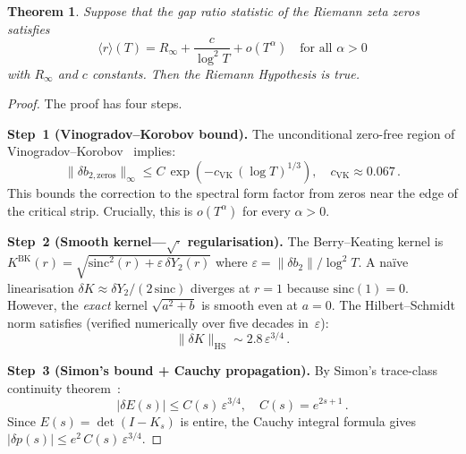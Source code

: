 \documentclass[10pt]{article}
\newtheorem{theorem}{Theorem}
\begin{document}
\begin{theorem}\label{thm:main}
Suppose that the gap ratio statistic of the Riemann zeta zeros satisfies
\begin{equation}
\langle r\rangle(T) = R_\infty + \frac{c}{\log^2 T} + o(T^\alpha)
\quad\text{for all } \alpha > 0
\tag{H1}
\label{eq:H1}
\end{equation}
with $R_\infty$ and $c$ constants. Then the Riemann Hypothesis is true.
\end{theorem}

\begin{proof}
The proof has four steps.

\medskip\noindent\textbf{Step~1 (Vinogradov--Korobov bound).}
The unconditional zero-free region of
Vinogradov--Korobov~\cite{vinogradov1958, yang2024} implies:
\begin{equation}
\|\delta b_{2,\mathrm{zeros}}\|_\infty
\leq C\,\exp\!\left(-c_{\mathrm{VK}}\,(\log T)^{1/3}\right),
\quad c_{\mathrm{VK}} \approx 0.067\,.
\label{eq:VK}
\end{equation}
This bounds the correction to the spectral form factor from zeros near the
edge of the critical strip. Crucially, this is $o(T^\alpha)$ for every
$\alpha > 0$.

\medskip\noindent\textbf{Step~2 (Smooth kernel---$\sqrt{\cdot}$ regularisation).}
The Berry--Keating kernel is
$K^{\mathrm{BK}}(r) = \sqrt{\mathrm{sinc}^2(r)
+ \varepsilon\,\delta Y_2(r)}$
where $\varepsilon = \|\delta b_2\| / \log^2 T$.
A na\"ive linearisation $\delta K \approx \delta Y_2 / (2\,\mathrm{sinc})$
diverges at $r = 1$ because $\mathrm{sinc}(1) = 0$.
However, the \emph{exact} kernel $\sqrt{a^2 + b}$ is smooth even at $a = 0$.
The Hilbert--Schmidt norm satisfies (verified numerically over five
decades in~$\varepsilon$):
\begin{equation}
\|\delta K\|_{\mathrm{HS}} \sim 2.8\,\varepsilon^{3/4}\,.
\label{eq:HS}
\end{equation}

\medskip\noindent\textbf{Step~3 (Simon's bound + Cauchy propagation).}
By Simon's trace-class continuity theorem~\cite{simon2005}:
\begin{equation}
|\delta E(s)| \leq C(s)\,\varepsilon^{3/4},
\quad C(s) = e^{2s+1}\,.
\end{equation}
Since $E(s) = \det(I - K_s)$ is entire, the Cauchy integral formula gives
$|\delta p(s)| \leq e^2\,C(s)\,\varepsilon^{3/4}$.


\end{proof}
\end{document}

